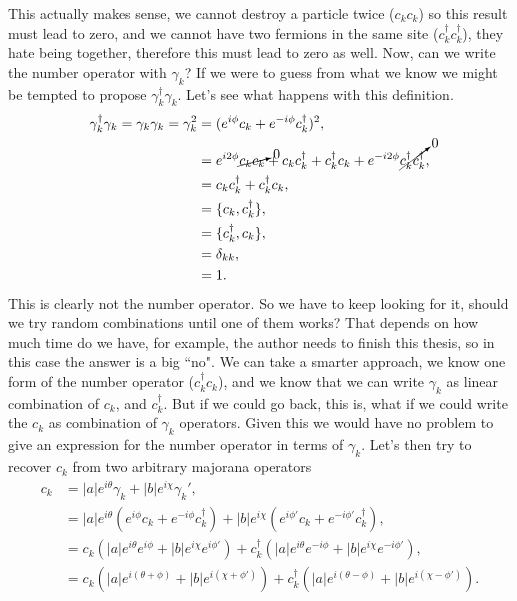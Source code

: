 This actually makes sense, we cannot destroy a particle twice ($c_kc_k$) so this result must lead to zero, and we cannot have two fermions in the same site ($c_k^\dagger c_k^\dagger$), they hate being together, therefore this must lead to zero as well. Now, can we write the number operator with $\gamma_k$? If we were to guess from what we know we might be tempted to propose $\gamma_k^\dagger \gamma_k$. Let's see what happens with this definition.
\begin{equation}
\begin{aligned}[b]
    \gamma_k^\dagger \gamma_k = \gamma_k\gamma_k = \gamma_k^2 &= (e^{i\phi}c_k + e^{-i\phi}c_k^\dagger)^2, \\
    &= e^{i2\phi}\cancelto{0}{c_kc_k} + c_k c_k^\dagger + c_k^\dagger c_k + e^{-i2\phi}\cancelto{0}{c_k^\dagger c_k^\dagger},\\
    &= c_k c_k^\dagger + c_k^\dagger c_k,\\
    &= \{c_k, c_k^\dagger\},\\
    &= \{c_k^\dagger, c_k\}, \\
    & = \delta_{kk},\\
    &= 1.
    \end{aligned}
    \label{quadOne}
\end{equation}
This is clearly not the number operator. So we have to keep looking for it, should we try random combinations until one of them works? That depends on how much time do we have, for example, the author needs to finish this thesis, so in this case the answer is a big ``no". We can take a smarter approach, we know one form of the number operator ($c_k^\dagger c_k$), and we know that we can write $\gamma_k$ as linear combination of $c_k$, and $c_k^\dagger$. But if we could go back, this is, what if we could write the $c_k$ as combination of $\gamma_k$ operators. Given this we would have no problem to give an expression for the number operator in terms  of $\gamma_k$. Let's then try to recover $c_k$ from two arbitrary majorana operators
\begin{equation*}
    \begin{aligned}
        c_k &= |a|e^{i\theta} \gamma_k + |b|e^{i\chi}\gamma_k',\\
        &=|a|e^{i\theta} (e^{i\phi}c_k + e^{-i\phi}c_k^\dagger) + |b|e^{i\chi} (e^{i\phi'}c_k + e^{-i\phi'}c_k^\dagger),\\
        &= c_k\left(|a|e^{i\theta} e^{i\phi} + |b|e^{i\chi}e^{i\phi'}\right) + c_k^\dagger \left(|a|e^{i\theta}e^{-i\phi} +  |b|e^{i\chi}e^{-i\phi'}\right),\\
        &= c_k\left(|a|e^{i(\theta+\phi)} + |b|e^{i(\chi+\phi')}\right) + c_k^\dagger \left(|a|e^{i(\theta-\phi)} +  |b|e^{i(\chi-\phi')}\right).\\
    \end{aligned}
\end{equation*}
